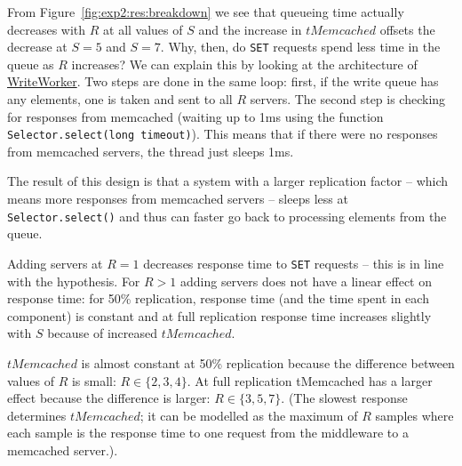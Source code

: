 \documentclass[11pt]{article}
\newcommand{\set}[0]{\texttt{SET}}
\newcommand{\linkmain}[1]{\href{https://gitlab.inf.ethz.ch/pungast/asl-fall16-project/blob/master/src/main/java/asl/#1.java}{#1}}
\begin{document}
From Figure~\ref{fig:exp2:res:breakdown} we see that queueing time actually decreases with $R$ at all values of $S$ and the increase in $tMemcached$ offsets the decrease at $S=5$ and $S=7$. Why, then, do \set{} requests spend less time in the queue as $R$ increases? We can explain this by looking at the architecture of \linkmain{WriteWorker}. Two steps are done in the same loop: first, if the write queue has any elements, one is taken and sent to all $R$ servers. The second step is checking for responses from memcached (waiting up to 1ms using the function \verb+Selector.select(long timeout)+). This means that if there were no responses from memcached servers, the thread just sleeps 1ms.

The result of this design is that a system with a larger replication factor -- which means more responses from memcached servers -- sleeps less at \verb+Selector.select()+ and thus can faster go back to processing elements from the queue.

Adding servers at $R=1$ decreases response time to \set{} requests -- this is in line with the hypothesis. For $R>1$ adding servers does not have a linear effect on response time: for 50\% replication, response time (and the time spent in each component) is constant and at full replication response time increases slightly with $S$ because of increased $tMemcached$.

$tMemcached$ is almost constant at 50\% replication because the difference between values of $R$ is small: $R \in \{2,3,4\}$. At full replication tMemcached has a larger effect because the difference is larger: $R \in \{3,5,7\}$. (The slowest response determines $tMemcached$; it can be modelled as the maximum of $R$ samples where each sample is the response time to one request from the middleware to a memcached server.).
\end{document}
